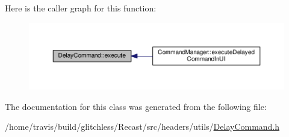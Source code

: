 Here is the caller graph for this function\-:
\nopagebreak
\begin{figure}[H]
\begin{center}
\leavevmode
\includegraphics[width=350pt]{class_delay_command_aab05b5601b95c0de34889a597bb7e4a0_icgraph}
\end{center}
\end{figure}




The documentation for this class was generated from the following file\-:\begin{DoxyCompactItemize}
\item 
/home/travis/build/glitchless/\-Recast/src/headers/utils/\hyperlink{_delay_command_8h}{Delay\-Command.\-h}\end{DoxyCompactItemize}
